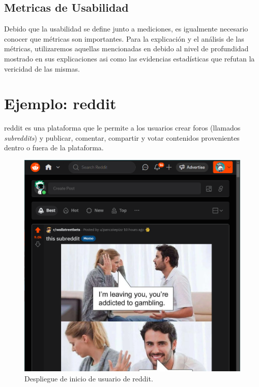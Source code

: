 \subsection{Metricas de Usabilidad}
Debido que la usabilidad se define junto a mediciones, es igualmente necesario conocer que métricas son
importantes. Para la explicación y el análisis de las métricas, utilizaremos aquellas mencionadas en \cite{kokol-1995,purchase-2011,hentati-2015} %
debido al nivel de profundidad mostrado en sus explicaciones asi como las evidencias estadísticas
que refutan la vericidad de las mismas.
\\

\section{Ejemplo: reddit}
reddit es una plataforma que le permite a los usuarios crear foros (llamados \emph{subreddits}) y
publicar, comentar, compartir y votar contenidos provenientes dentro o fuera de la plataforma.
\begin{figure}[t]
    \centering
    \includegraphics[scale=0.33]{../images/fig2.png}
    \caption{Despliegue de inicio de usuario de reddit.}
    \label{fig:fig2}    
\end{figure}
\\


